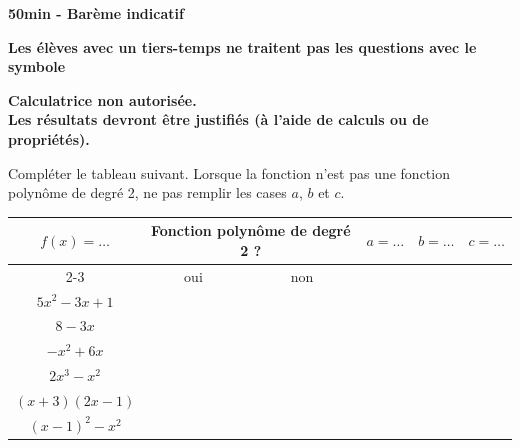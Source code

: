 \documentclass[11pt,a4paper]{article}  %
\begin{document}
	\graphicspath{{images/}}


	\begin{center}
	\end{center}

	\begin{center}\textbf{50min - Barème indicatif}\end{center}
	\begin{center}\textbf{Les élèves avec un tiers-temps ne traitent pas les questions avec le symbole }\end{center}
	\begin{center}\textbf{Calculatrice non autorisée.\\Les résultats devront être justifiés (à l'aide de calculs ou de propriétés).}\end{center}


	Compléter le tableau suivant. Lorsque la fonction n'est pas une fonction polynôme de degré 2, ne pas remplir les cases $a$, $b$ et $c$.

	\begin{center}
		\setlength{\extrarowheight}{3pt}
		\setlength{\tabcolsep}{0.3cm}
		\begin{tabular}{|c|c|c|c|c|c|}
			\hline
			\multirow{2}{*}{$f(x)=\ldots$} & \multicolumn{2}{c|}{Fonction polynôme de degré 2 ?} & \multirow{2}{*}{$a=\ldots$} & \multirow{2}{*}{$b=\ldots$} & \multirow{2}{*}{$c=\ldots$} \\
			\cline{2-3}
			& oui & non & & & \\
			\hline $5x^2-3x+1$ & & & & & \\
			\hline $8-3x$ & & & & & \\
			\hline $-x^2+6x$ & & & & & \\
			\hline $2x^3-x^2$ & & & & & \\
			\hline $(x+3)(2x-1)$ & & & & & \\
			\hline $(x-1)^2-x^2$ & & & & & \\
			\hline
		\end{tabular}
	\end{center}
\end{document}
